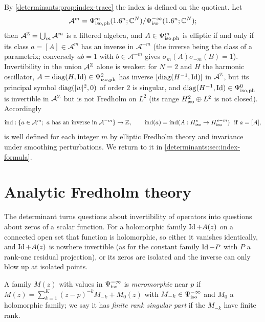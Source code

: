 By \cref{determinants:prop:index-trace} the index is defined on the quotient.
Let
\begin{equation*}
  \mathcal A^m=\Psi^{m}_{\mathrm{iso,ph}}(1.6^n;\mathbb{C}^N)/\Psi^{-\infty}_{\mathrm{iso}}(1.6^n;\mathbb{C}^N);
\end{equation*}
then $\mathcal A^{\mathbb{Z}}=\bigcup_m\mathcal A^m$ is a filtered algebra, and
$A\in\Psi^{m}_{\mathrm{iso,ph}}$ is elliptic if and only if its class $a=[A]\in\mathcal A^m$
has an inverse in $\mathcal A^{-m}$ (the inverse being the class of a
parametrix; conversely $ab=1$ with $b\in\mathcal A^{-m}$ gives
$\sigma_m(A)\sigma_{-m}(B)=1$). Invertibility in the union $\mathcal A^{\mathbb{Z}}$
alone is weaker: for $N=2$ and $H$ the harmonic oscillator,
$A=\operatorname{diag}(H,\operatorname{Id})\in\Psi^{2}_{\mathrm{iso,ph}}$ has inverse
$[\operatorname{diag}(H^{-1},\operatorname{Id})]$ in $\mathcal A^{\mathbb{Z}}$, but its principal
symbol $\operatorname{diag}(\lvert w\rvert^2,0)$ of order $2$ is singular, and
$\operatorname{diag}(H^{-1},\operatorname{Id})\in\Psi^{0}_{\mathrm{iso,ph}}$ is invertible in
$\mathcal A^{\mathbb{Z}}$ but is not Fredholm on $L^2$ (its range
$H^{2}_{\mathrm{iso}}\oplus L^2$ is not closed). Accordingly
\begin{equation*}
  \operatorname{ind}:\{a\in\mathcal A^m;\ a\text{ has an inverse in }\mathcal A^{-m}\}\to\mathbb{Z},\qquad
  \operatorname{ind}(a)=\operatorname{ind}(A:H^{s}_{\mathrm{iso}}\to H^{s-m}_{\mathrm{iso}})\ \text{ if }a=[A],
\end{equation*}
is well defined for each integer $m$ by elliptic Fredholm theory and
invariance under smoothing perturbations. We return to it in \cref{determinants:sec:index-formula}.

\section{Analytic Fredholm theory}\label{determinants:sec:fredholm}

The determinant turns questions about invertibility of operators into
questions about zeros of a scalar function. For a holomorphic family
$\operatorname{Id}+A(z)$ on a connected open set that function is holomorphic, so either it
vanishes identically, and $\operatorname{Id}+A(z)$ is nowhere invertible (as for the
constant family $\operatorname{Id}-P$ with $P$ a rank-one residual projection), or its zeros
are isolated and the inverse can only blow up at isolated points.

A family $M(z)$ with values in $\Psi^{-\infty}_{\mathrm{iso}}$ is \emph{meromorphic} near
$p$ if $M(z)=\sum_{k=1}^K(z-p)^{-k}M_{-k}+M_0(z)$ with $M_{-k}\in\Psi^{-\infty}_{\mathrm{iso}}$
and $M_0$ a holomorphic family; we say it has \emph{finite rank singular part}
if the $M_{-k}$ have finite rank.

